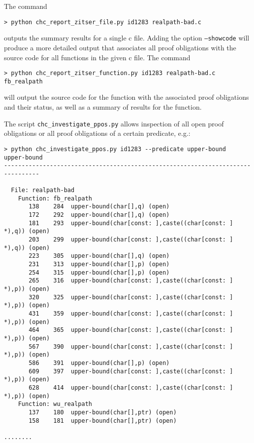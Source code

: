 \documentclass[11pt]{article}
\begin{document}
The command
\begin{verbatim}
> python chc_report_zitser_file.py id1283 realpath-bad.c
\end{verbatim}
outputs the summary results for a single c file. Adding the option {\tt --showcode}
will produce a more detailed output that associates all proof obligations with the
source code for all functions in the given c file. The command
\begin{verbatim}
> python chc_report_zitser_function.py id1283 realpath-bad.c fb_realpath
\end{verbatim}
will output the source code for the function with the associated proof obligations
and their status, as well as a summary of results for the function.

The script {\tt chc\_investigate\_ppos.py} allows inspection of all open proof obligations
or all proof obligations of a certain predicate, e.g.:
\begin{small}
\begin{verbatim}
> python chc_investigate_ppos.py id1283 --predicate upper-bound
upper-bound
--------------------------------------------------------------------------------

  File: realpath-bad
    Function: fb_realpath
       138    284  upper-bound(char[],q) (open)
       172    292  upper-bound(char[],q) (open)
       181    293  upper-bound(char[const: ],caste((char[const: ] *),q)) (open)
       203    299  upper-bound(char[const: ],caste((char[const: ] *),q)) (open)
       223    305  upper-bound(char[],q) (open)
       231    313  upper-bound(char[],p) (open)
       254    315  upper-bound(char[],p) (open)
       265    316  upper-bound(char[const: ],caste((char[const: ] *),p)) (open)
       320    325  upper-bound(char[const: ],caste((char[const: ] *),p)) (open)
       431    359  upper-bound(char[const: ],caste((char[const: ] *),p)) (open)
       464    365  upper-bound(char[const: ],caste((char[const: ] *),p)) (open)
       567    390  upper-bound(char[const: ],caste((char[const: ] *),p)) (open)
       586    391  upper-bound(char[],p) (open)
       609    397  upper-bound(char[const: ],caste((char[const: ] *),p)) (open)
       628    414  upper-bound(char[const: ],caste((char[const: ] *),p)) (open)
    Function: wu_realpath
       137    180  upper-bound(char[],ptr) (open)
       158    181  upper-bound(char[],ptr) (open)

........
\end{verbatim}
\end{small}
\end{document}
